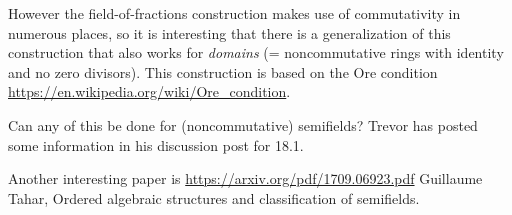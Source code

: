 \documentclass{amsart}
\begin{document}
However the field-of-fractions construction makes use of commutativity in numerous places, so it is interesting that there is a generalization of this construction that also works for \textit{domains} (= noncommutative rings with identity and no zero divisors). This construction is based on the Ore condition \url{https://en.wikipedia.org/wiki/Ore_condition}.

Can any of this be done for (noncommutative) semifields? Trevor has posted some information in his discussion post for 18.1.

Another interesting paper is \url{https://arxiv.org/pdf/1709.06923.pdf} Guillaume Tahar, Ordered algebraic structures and classification of semifields.
\end{document}
